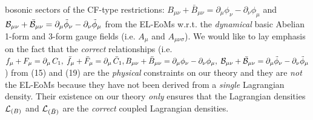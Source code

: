 \documentclass[12pt]{article}
\begin{document}
bosonic sectors of the CF-type restrictions: $B_{\mu\nu} + \bar B_{\mu\nu} = \partial_\mu \phi_\nu - \partial_\nu \phi_\mu$ and
${\cal B}_{\mu\nu} + \bar {\cal B}_{\mu\nu} = \partial_\mu \tilde \phi_\nu - \partial_\nu \tilde \phi_\mu$ from the EL-EoMs
w.r.t. the {\it dynamical} basic Abelian 1-form and 3-form gauge fields (i.e. $A_\mu$ and $A_{\mu\nu\sigma}$). We would like to lay
emphasis on the fact that the {\it correct} relationships (i.e. $f_\mu + F_\mu =  \partial_\mu\, C_1,\;\bar f_\mu + \bar F_\mu = \partial_\mu\, \bar C_1,
B_{\mu\nu} + \bar B_{\mu\nu} = \partial_\mu \phi_\nu - \partial_\nu \phi_\mu, \; {\cal B}_{\mu\nu} + \bar {\cal B}_{\mu\nu} 
= \partial_\mu \tilde \phi_\nu - \partial_\nu \tilde \phi_\mu $) from (15) and (19) are the {\it physical} constraints on our theory and they are 
{\it not} the EL-EoMs because they have not been derived from a {\it single} Lagrangian density. Their existence on our theory {\it only} ensures that
the Lagrangian densities ${\cal L}_{(B)} $ and ${\cal L}_{(\bar B)} $ are the {\it correct} coupled Lagrangian densities.
\end{document}

